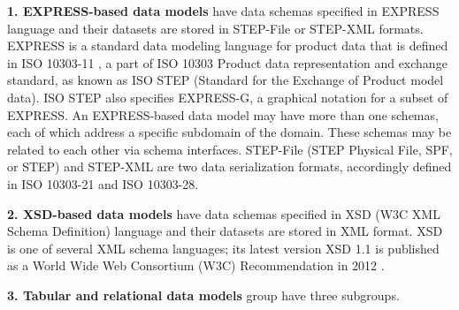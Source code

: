 

\textbf{1. EX\-PRESS-ba\-sed da\-ta mod\-els} have data schemas specified in EXPRESS language \cite{iso2004express} and their datasets are stored in STEP-File or STEP-XML formats.
EXPRESS is a standard data modeling language for product data that is defined in ISO 10303-11 \cite{iso2004express}, a part of ISO 10303 Product data representation and exchange standard, as known as ISO STEP (Standard for the Exchange of Product model data).
ISO STEP also specifies EXPRESS-G, a graphical notation for a subset of EXPRESS.
An EXPRESS-based data model may have more than one schemas, each of which address a specific subdomain of the domain.
These schemas may be related to each other via schema interfaces.
STEP-File (STEP Physical File, SPF, or STEP) \cite{iso2016stepfile} and STEP-XML \cite{iso2007stepxml} are two data serialization formats, accordingly defined in ISO 10303-21 and ISO 10303-28.




\textbf{2. XSD-\-ba\-sed da\-ta mod\-els} have data schemas specified in XSD (W3C XML Schema Definition) language and their datasets are stored in XML format.
XSD is one of several XML schema languages; its latest version XSD 1.1 is published as a World Wide Web Consortium (W3C) Recommendation in 2012 \cite{gao2009w3c, peterson2009w3c}.



\textbf{3. Tabular and relational data models} group have three subgroups.











